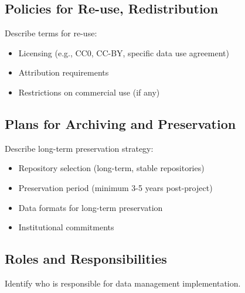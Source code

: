 \documentclass[11pt,letterpaper]{article}
\begin{document}
\subsection*{Policies for Re-use, Redistribution}
Describe terms for re-use:
\begin{itemize}
    \item Licensing (e.g., CC0, CC-BY, specific data use agreement)
    \item Attribution requirements
    \item Restrictions on commercial use (if any)
\end{itemize}

\subsection*{Plans for Archiving and Preservation}
Describe long-term preservation strategy:
\begin{itemize}
    \item Repository selection (long-term, stable repositories)
    \item Preservation period (minimum 3-5 years post-project)
    \item Data formats for long-term preservation
    \item Institutional commitments
\end{itemize}

\subsection*{Roles and Responsibilities}
Identify who is responsible for data management implementation.
\end{document}
